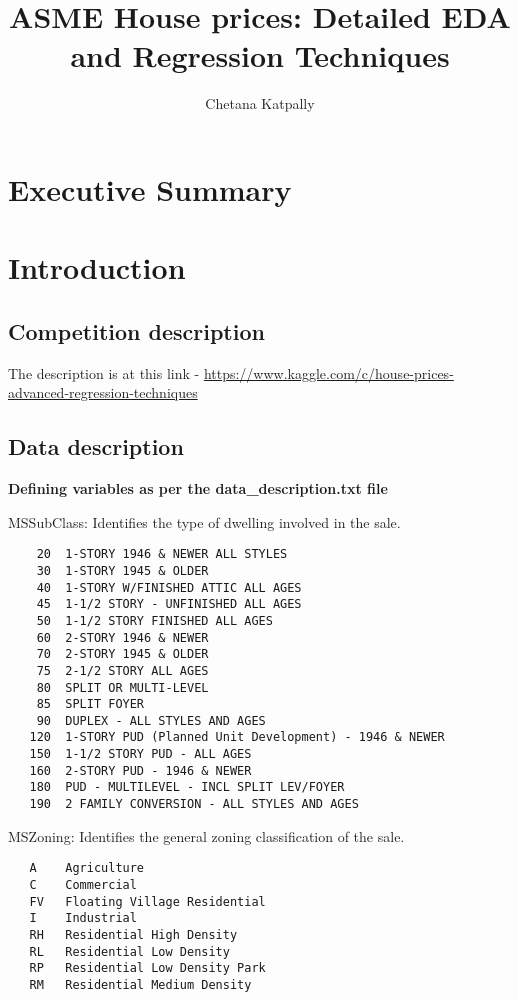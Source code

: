 \documentclass[]{article}
\title{ASME House prices: Detailed EDA and Regression Techniques}
\author{Chetana Katpally}
\date{}
\begin{document}
\maketitle

{
\setcounter{tocdepth}{4}
\tableofcontents
}
\section{Executive Summary}\label{executive-summary}

\section{Introduction}\label{introduction}

\subsection{Competition description}\label{competition-description}

The description is at this link -
\url{https://www.kaggle.com/c/house-prices-advanced-regression-techniques}

\subsection{Data description}\label{data-description}

\textbf{Defining variables as per the data\_description.txt file}

MSSubClass: Identifies the type of dwelling involved in the sale.

\begin{verbatim}
    20  1-STORY 1946 & NEWER ALL STYLES
    30  1-STORY 1945 & OLDER
    40  1-STORY W/FINISHED ATTIC ALL AGES
    45  1-1/2 STORY - UNFINISHED ALL AGES
    50  1-1/2 STORY FINISHED ALL AGES
    60  2-STORY 1946 & NEWER
    70  2-STORY 1945 & OLDER
    75  2-1/2 STORY ALL AGES
    80  SPLIT OR MULTI-LEVEL
    85  SPLIT FOYER
    90  DUPLEX - ALL STYLES AND AGES
   120  1-STORY PUD (Planned Unit Development) - 1946 & NEWER
   150  1-1/2 STORY PUD - ALL AGES
   160  2-STORY PUD - 1946 & NEWER
   180  PUD - MULTILEVEL - INCL SPLIT LEV/FOYER
   190  2 FAMILY CONVERSION - ALL STYLES AND AGES
\end{verbatim}

MSZoning: Identifies the general zoning classification of the sale.

\begin{verbatim}
   A    Agriculture
   C    Commercial
   FV   Floating Village Residential
   I    Industrial
   RH   Residential High Density
   RL   Residential Low Density
   RP   Residential Low Density Park 
   RM   Residential Medium Density
\end{verbatim}
\end{document}
